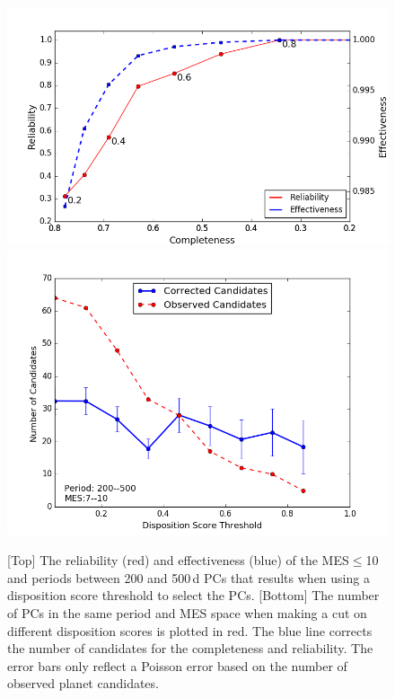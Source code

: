 \begin{figure}[ht]
 \begin{center}
  \includegraphics[width=1.0\linewidth]{fig-CRadjustScore-DR25.png}
  \includegraphics[width=1.0\linewidth]{fig-varyScoreNcandidatesBox2.png}
  \caption{\label{f:adjscore}[Top] The reliability (red) and effectiveness (blue) of the MES$\leq$10 and periods between 200 and 500\,d PCs that results when using a disposition score threshold to select the PCs.  [Bottom] The number of PCs in the same period and MES space when making a cut on different disposition scores is plotted in red.  The blue line corrects the number of candidates for the completeness and reliability. The error bars only reflect a Poisson error based on the number of observed planet candidates.}
 \end{center}
 \end{figure}


